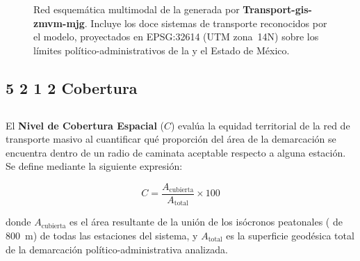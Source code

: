 \begin{figure}[htbp]
  \centering
  \caption[Red multimodal de transporte de la ZMVM]{Red esquemática multimodal de la \zmvm{} generada por \textbf{Transport-gis-zmvm-mjg}.
    Incluye los doce sistemas de transporte reconocidos por el modelo, proyectados en EPSG:32614 (UTM zona~14N) sobre los límites político-administrativos
    de la \cdmx{} y el Estado de México. }
  \label{fig:mapa-red-esquematica}
\end{figure}


\subsection*{5 2 1 2 Cobertura}
\subsection{}
\label{subsec:cobertura-espacial}

El \textbf{Nivel de Cobertura Espacial} ($C$) evalúa la equidad territorial de
la red de transporte masivo al cuantificar qué proporción del área de la
demarcación se encuentra dentro de un radio de caminata aceptable respecto
a alguna estación. Se define mediante la siguiente expresión:

\begin{equation}
    C = \frac{A_{\text{cubierta}}}{A_{\text{total}}} \times 100
    \label{eq:cobertura-res}
\end{equation}

donde $A_{\text{cubierta}}$ es el área resultante de la unión de los
isócronos peatonales ( de 800~m) de todas las estaciones del sistema,
y $A_{\text{total}}$ es la superficie geodésica total de la demarcación
político-administrativa analizada.

